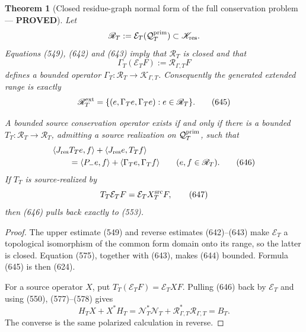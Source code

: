 \documentclass[11pt]{article}
\newtheorem{theorem}{Theorem}
\newcommand{\PROVED}{\textcolor{green!45!black}{\textbf{PROVED}}}
\begin{document}
\begin{theorem}[Closed residue-graph normal form of the full conservation
problem --- \PROVED]
Let
\[
 \mathscr R_T:=\mathcal E_T(\mathcal Q_T^{\rm prim})
 \subset\mathscr K_{\rm res}.
\]
Equations (549), (642) and (643) imply that \(\mathscr R_T\) is closed and
that
\begin{equation}
 \Gamma_T(\mathcal E_TF):=\mathcal R_{\Gamma,T}F     \tag{644}
\end{equation}
defines a bounded operator
\(\Gamma_T:\mathscr R_T\to\mathscr K_{\Gamma,T}\).
Consequently the generated extended range is exactly
\begin{equation}
 \mathscr R_T^{\rm ext}
 =\{(e,\Gamma_Te,\Gamma_Te):e\in\mathscr R_T\}.       \tag{645}
\end{equation}

A bounded source conservation operator exists if and only if there is a
bounded \(T_T:\mathscr R_T\to\mathscr R_T\), admitting a source realization
on \(\mathcal Q_T^{\rm prim}\), such that
\begin{align}
 &\langle J_{\rm res}T_Te,f\rangle+
  \langle J_{\rm res}e,T_Tf\rangle\notag\\
 &\qquad=
 \langle P_-e,f\rangle+
 \langle\Gamma_Te,\Gamma_Tf\rangle
 \qquad(e,f\in\mathscr R_T).                         \tag{646}
\end{align}
If \(T_T\) is source-realized by
\begin{equation}
 T_T\mathcal E_TF=\mathcal E_TX_T^{\rm src}F,        \tag{647}
\end{equation}
then (646) pulls back exactly to (553).
\end{theorem}

\begin{proof}
The upper estimate (549) and reverse estimates (642)--(643) make
\(\mathcal E_T\) a topological isomorphism of the common form domain onto
its range, so the latter is closed.  Equation (575), together with (643),
makes (644) bounded.  Formula (645) is then (624).

For a source operator \(X\), put
\(T_T(\mathcal E_TF)=\mathcal E_TXF\).  Pulling (646) back by
\(\mathcal E_T\) and using (550), (577)--(578) gives
\[
 H_TX+X^*H_T
 =\mathcal N_T^*\mathcal N_T+
  \mathcal R_{\Gamma,T}^*\mathcal R_{\Gamma,T}=B_T.
\]
The converse is the same polarized calculation in reverse.
\end{proof}
\end{document}
